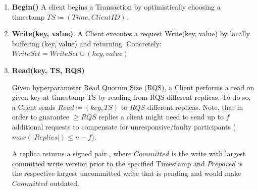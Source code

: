 \begin{enumerate}
\item \textbf{Begin()} A client begins a Transaction by optimistically choosing a timestamp $TS \coloneqq (Time, Client ID)$. 
\item \textbf{Write(key, value)}. A Client executes a request Write(key, value) by locally buffering (key, value) and returning. Concretely: $WriteSet = WriteSet \cup (key, value)$


\item \textbf{Read(key, TS, RQS)} 


Given hyperparameter Read Quorum Size (RQS), a Client performs a read on given key at timestamp TS by reading from RQS different replicas. To do so, a Client sends $Read \coloneqq (key, TS)$  to $RQS$ different replicas. Note, that in order to guarantee $\geq RQS$ replies a client might need to send up to $f$ additional requests to compensate for unresponsive/faulty participants ($max(|Replies|) \leq n-f$).  
\\


A replica returns a signed pair  , where $Committed$ is the write with largest committed write version prior to the specified Timestamp and $Prepared$ is the respective largest uncommitted write that is pending and would make $Committed$ outdated. 


\end{enumerate}

